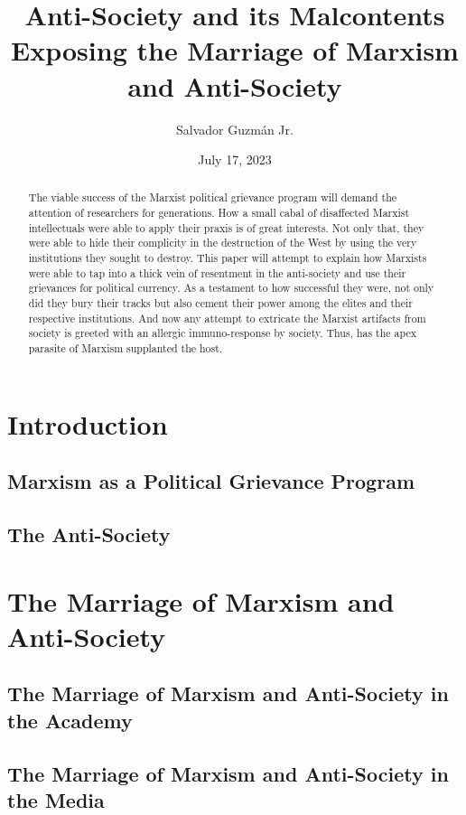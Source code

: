 \documentclass[12pt]{article}
\title{
Anti-Society and its Malcontents \\
\large Exposing the Marriage of Marxism and Anti-Society}
\author{Salvador Guzm\'an Jr.}
\date{July 17, 2023}
\begin{document}
\maketitle
\pagebreak

\begin{abstract}
    The viable success of the Marxist political grievance program will demand the attention of researchers for generations.
    How a small cabal of disaffected Marxist intellectuals were able to apply their praxis is of great interests.
    Not only that, they were able to hide their complicity in the destruction of the West by using the very institutions they sought to destroy.
    This paper will attempt to explain how Marxists were able to tap into a thick vein of resentment in the anti-society and use their grievances for political currency.
    As a testament to how successful they were, not only did they bury their tracks but also cement their power among the elites and their respective institutions.
    And now any attempt to extricate the Marxist artifacts from society is greeted with an allergic immuno-response by society.
    Thus, has the apex parasite of Marxism supplanted the host.

\end{abstract}
\pagebreak
\tableofcontents
\pagebreak

\section{Introduction}
\subsection{Marxism as a Political Grievance Program}
\subsection{The Anti-Society}

\section{The Marriage of Marxism and Anti-Society}
\subsection{The Marriage of Marxism and Anti-Society in the Academy}
\subsection{The Marriage of Marxism and Anti-Society in the Media}
\end{document}
